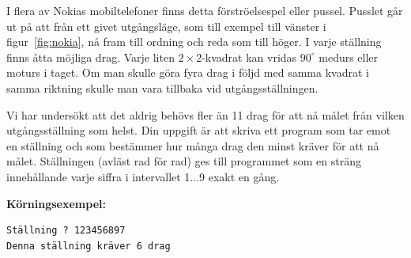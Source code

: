 \documentclass[a4paper,12pt]{article}
\begin{document}
I flera av Nokias mobiltelefoner finns detta förströelsespel eller pussel. Pusslet går ut på att från ett givet utgångsläge, som till exempel till vänster i figur~\ref{fig:nokia}, nå fram till ordning och reda som till höger. I varje ställning finns åtta möjliga drag. Varje liten $2\times2$-kvadrat kan vridas $90^\circ$ medurs eller moturs i taget. Om man skulle göra fyra drag i följd med samma kvadrat i samma riktning skulle man vara tillbaka vid utgångsställningen.

Vi har undersökt att det aldrig behövs fler än 11 drag för att nå målet från vilken utgångsställning som helst. Din uppgift är att skriva ett program som tar emot en ställning och som bestämmer hur många drag den minst kräver för att nå målet. Ställningen (avläst rad för rad) ges till programmet som en sträng innehållande varje siffra i intervallet 1...9 exakt en gång.

\textbf{Körningsexempel:}

\begin{lstlisting}
Ställning ? 123456897
Denna ställning kräver 6 drag
\end{lstlisting}

\end{document}
